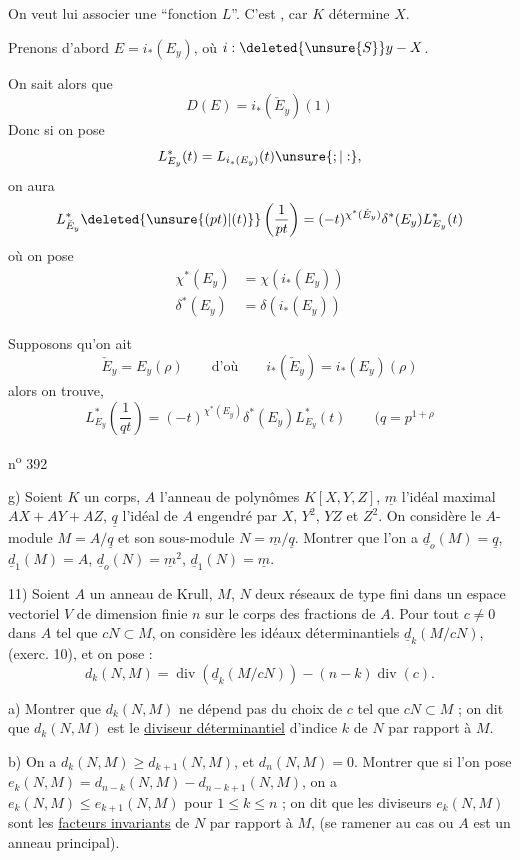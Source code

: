 On veut lui associer une \textquotedblleft fonction $L$\textquotedblright. C'est , car $K$ détermine $X$.

Prenons d'abord $E=i_*(E_y)$, où $i:\deleted{\unsure{S}}y\mathbin{-}X$.

On sait alors que
\[
 D(E)=i_*(\check E_y)(1)
\]
 Donc si on pose
\[
 L^*_{E_y}(t)=L_{i_*(E_y)}(t)\unsure{;|:},
\]
on aura
\[
 L^*_{\check E_y}\deleted{\unsure{(pt)|(t)}}\left(\frac{1}{pt}\right)
 =(-t)^{\chi^*(\check E_y)}\delta^*(E_y)L^*_{E_y}(t)
\]
où on pose
\[
 \begin{aligned}
 \chi^*(E_y)&=\chi\left(i_*(E_y)\right)\\
 \delta^*(E_y)&=\delta\left(i_*(E_y)\right)
 \end{aligned}
\]

Supposons qu'on ait
\[
 \check E_y=E_y(\rho)\qquad\text{d'où}\qquad
 i_*(\check E_y)=i_*(E_y)(\rho)
\]
alors on trouve,
\[
 \boxed{L^*_{E_y}\left(\frac{1}{qt}\right)
 =(-t)^{\chi^*(E_y)}\delta^*(E_y)L^*_{E_y}(t)}
 \qquad (q=p^{1+\rho}
\]

n\textsuperscript{o} 392

g) Soient $K$ un corps, $A$ l'anneau de polynômes $K[X,Y,Z]$, $\underline m$ l'idéal maximal $AX+AY+AZ$, $\underline q$ l'idéal de $A$ engendré par $X$, $Y^2$, $YZ$ et $Z^2$. On considère le $A$-module $M=A/\underline q$ et son sous-module $N=\underline m/\underline q$. Montrer que l'on a $\underline d_o(M)=\underline q$, $\underline d_1(M)=A$, $\underline d_o(N)=\underline m^2$, $\underline d_1(N)=\underline m$.

11) Soient $A$ un anneau de Krull, $M$, $N$ deux réseaux de type fini dans un espace vectoriel $V$ de dimension finie $n$ sur le corps des fractions de $A$. Pour tout $c\ne 0$ dans $A$ tel que $cN\subset M$, on considère les idéaux déterminantiels $\underline d_k(M/cN)$, (exerc. 10), et on pose :
\[
 d_k(N,M)=\operatorname{div}(\underline d_k(M/cN))-(n-k)\operatorname{div}(c).
\]

a) Montrer que $d_k(N,M)$ ne dépend pas du choix de $c$ tel que $cN\subset M$ ; on dit que $d_k(N,M)$ est le \uline{diviseur déterminantiel} d'indice $k$ de $N$ par rapport à $M$.

b) On a $d_k(N,M)\geq d_{k+1}(N,M)$, et $d_n(N,M)=0$. Montrer que si l'on pose $e_k(N,M)=d_{n-k}(N,M)-d_{n-k+1}(N,M)$, on a $e_k(N,M)\leq e_{k+1}(N,M)$ pour $1\leq k\leq n$ ; on dit que les diviseurs $e_k(N,M)$ sont les \uline{facteurs invariants} de $N$ par rapport à $M$, (se ramener au cas o\rlap{\handwritten{\`{\phantom{u}}}}u $A$ est un anneau principal).

